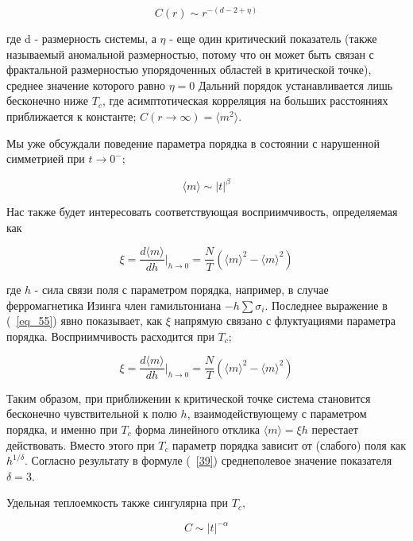 \documentclass[11pt]{article}
\begin{document}
\begin{equation}
C(r) \sim r^{-(d-2+\eta)}
\label{eq_53}
\end{equation}

где d - размерность системы, а $\eta$ - еще один критический показатель (также называемый аномальной размерностью, потому что он может быть связан с фрактальной размерностью упорядоченных областей в критической точке), среднее значение которого равно $\eta = 0$ Дальний порядок устанавливается лишь бесконечно ниже $T_c$, где асимптотическая корреляция на больших расстояниях приближается к константе; $C(r → ∞) = \langle m^2 \rangle$.

Мы уже обсуждали поведение параметра порядка в состоянии с нарушенной симметрией при $t → 0^{-}$;

\begin{equation}
\langle m \rangle \sim |t|^\beta
\label{eq_54}
\end{equation}

Нас также будет интересовать соответствующая восприимчивость, определяемая как

\begin{equation}
\xi = \frac{d\langle m \rangle}{dh}|_{h→0} = \frac{N}{T}(\langle m \rangle^2 - \langle m \rangle^2)
\label{eq_55}
\end{equation}

где $h$ - сила связи поля с параметром порядка, например, в случае ферромагнетика Изинга член гамильтониана $−h\sum \sigma_i$. Последнее выражение в (~\ref{eq_55}) явно показывает, как $\xi$ напрямую связано с флуктуациями параметра порядка. Восприимчивость расходится при $T_c$;

\begin{equation}
\xi = \frac{d\langle m \rangle}{dh}|_{h→0} = \frac{N}{T}(\langle m \rangle^2 - \langle m \rangle^2)
\label{eq_56}
\end{equation}

Таким образом, при приближении к критической точке система становится бесконечно чувствительной к полю $h$, взаимодействующему с параметром порядка, и именно при $T_c$ форма линейного отклика $\langle m \rangle = \xi h$ перестает действовать. Вместо этого при $T_c$ параметр порядка зависит от (слабого) поля как $h^{1/ \delta}$.
Согласно результату в формуле (~\ref{39}) среднеполевое значение показателя $\delta = 3$.

Удельная теплоемкость также сингулярна при $T_c$,

\begin{equation}
C \sim |t|^{-\alpha}
\label{eq_57}
\end{equation}
\end{document}
